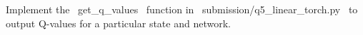 \item {}
Implement the ~get_q_values~ function in ~submission/q5_linear_torch.py~ to output Q-values for a particular state and network.